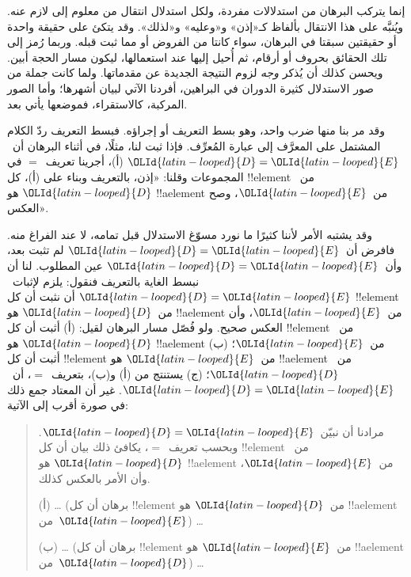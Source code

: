 \documentclass[../../../include/open-logic-section]{subfiles}
\begin{document}


إنما يتركب البرهان من استدلالات مفردة، ولكل استدلال انتقال من معلوم
إلى لازم عنه. ويُنبَّه على هذا الانتقال بألفاظ كـ«إذن» و«وعليه»
و«لذلك». وقد يتكئ على حقيقة واحدة أو حقيقتين سبقتا في البرهان، سواء
كانتا من الفروض أو مما ثبت قبله. وربما رُمز إلى تلك الحقائق بحروف أو
أرقام، ثم أُحيل إليها عند استعمالها، ليكون مسار الحجة أبين. ويحسن
كذلك أن يُذكر \emph{وجه} لزوم النتيجة الجديدة عن مقدماتها. ولما كانت
جملة من صور الاستدلال كثيرة الدوران في البراهين، أفردنا الآتي لبيان
أشهرها؛ وأما الصور المركبة، كالاستقراء، فموضعها يأتي بعد.

وقد مر بنا منها ضرب واحد، وهو بسط التعريف أو إجراؤه. فبسط التعريف ردّ
الكلام المشتمل على المعرَّف إلى عبارة المُعرِّف. فإذا ثبت لنا، مثلًا،
في أثناء البرهان أن~${\OLId{latin-looped}{D}} = {\OLId{latin-looped}{E}}$ (أ)، أجرينا تعريف~$=$ في المجموعات وقلنا:
«إذن، بالتعريف وبناء على (أ)، كل !!{element} من~${\OLId{latin-looped}{D}}$ هو !!a{element}
من~${\OLId{latin-looped}{E}}$، وصح العكس».

وقد يشتبه الأمر لأننا كثيرًا ما نورد مسوّغ الاستدلال قبل تمامه، لا
عند الفراغ منه. فافرض أن~${\OLId{latin-looped}{D}} = {\OLId{latin-looped}{E}}$ لم تثبت بعد، وأن~${\OLId{latin-looped}{D}} = {\OLId{latin-looped}{E}}$ عين
المطلوب. لنا أن نبسط الغاية بالتعريف فنقول: يلزم لإثبات~${\OLId{latin-looped}{D}} = {\OLId{latin-looped}{E}}$ أن نثبت أن كل
!!{element} من~${\OLId{latin-looped}{D}}$ هو !!a{element} من~${\OLId{latin-looped}{E}}$، وأن العكس صحيح. ولو فُصّل
مسار البرهان لقيل: (أ) أثبت أن كل !!{element} من~${\OLId{latin-looped}{D}}$ هو !!a{element}
من~${\OLId{latin-looped}{E}}$؛ (ب) أثبت أن كل !!{element} من~${\OLId{latin-looped}{E}}$ هو !!a{element} من~${\OLId{latin-looped}{D}}$؛
(ج) يستنتج من (أ) و(ب)، بتعريف~$=$، أن~${\OLId{latin-looped}{D}} = {\OLId{latin-looped}{E}}$. غير أن المعتاد جمع
ذلك في صورة أقرب إلى الآتية:
\begin{quote}
مرادنا أن نبيّن~${\OLId{latin-looped}{D}} = {\OLId{latin-looped}{E}}$. وبحسب تعريف~$=$، يكافئ ذلك بيان أن كل
!!{element} من~${\OLId{latin-looped}{D}}$ هو !!a{element} من~${\OLId{latin-looped}{E}}$، وأن الأمر بالعكس كذلك.

(أ) \dots{} (برهان أن كل !!{element} من~${\OLId{latin-looped}{D}}$ هو !!a{element} من~${\OLId{latin-looped}{E}}$)
\dots

(ب) \dots{} (برهان أن كل !!{element} من~${\OLId{latin-looped}{E}}$ هو !!a{element} من~${\OLId{latin-looped}{D}}$)
\dots
\end{quote}
\end{document}
